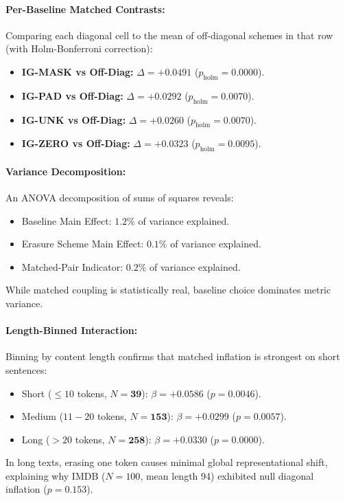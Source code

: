 \documentclass[11pt]{article}
\begin{document}
\paragraph{Per-Baseline Matched Contrasts:}
Comparing each diagonal cell to the mean of off-diagonal schemes in that row (with Holm-Bonferroni correction):
\begin{itemize}
    \item \textbf{IG-MASK vs Off-Diag:} $\Delta = +\mathbf{0.0491}$ ($p_{\text{holm}} = \mathbf{0.0000}$).
    \item \textbf{IG-PAD vs Off-Diag:} $\Delta = +\mathbf{0.0292}$ ($p_{\text{holm}} = \mathbf{0.0070}$).
    \item \textbf{IG-UNK vs Off-Diag:} $\Delta = +\mathbf{0.0260}$ ($p_{\text{holm}} = \mathbf{0.0070}$).
    \item \textbf{IG-ZERO vs Off-Diag:} $\Delta = +\mathbf{0.0323}$ ($p_{\text{holm}} = \mathbf{0.0095}$).
\end{itemize}

\paragraph{Variance Decomposition:}
An ANOVA decomposition of sums of squares reveals:
\begin{itemize}
    \item Baseline Main Effect: $\mathbf{1.2}\%$ of variance explained.
    \item Erasure Scheme Main Effect: $\mathbf{0.1}\%$ of variance explained.
    \item Matched-Pair Indicator: $\mathbf{0.2}\%$ of variance explained.
\end{itemize}
While matched coupling is statistically real, baseline choice dominates metric variance.

\paragraph{Length-Binned Interaction:}
Binning by content length confirms that matched inflation is strongest on short sentences:
\begin{itemize}
    \item Short ($\le 10$ tokens, $N=\mathbf{39}$): $\beta = +\mathbf{0.0586}$ ($p=\mathbf{0.0046}$).
    \item Medium ($11-20$ tokens, $N=\mathbf{153}$): $\beta = +\mathbf{0.0299}$ ($p=\mathbf{0.0057}$).
    \item Long ($> 20$ tokens, $N=\mathbf{258}$): $\beta = +\mathbf{0.0330}$ ($p=\mathbf{0.0000}$).
\end{itemize}
In long texts, erasing one token causes minimal global representational shift, explaining why IMDB ($N=100$, mean length 94) exhibited null diagonal inflation ($p=0.153$).
\end{document}
